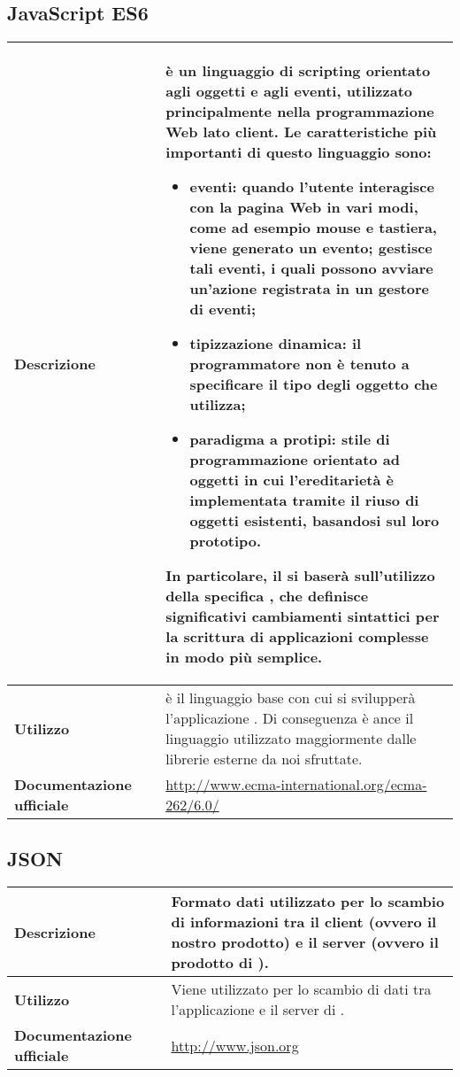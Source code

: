 \subsection{JavaScript ES6}
\label{JavaScript ES6}
\begin{table}[H]
	\centering
	\begin{tabular}{p{2cm}p{0.5cm}p{11.5cm}}
		\arrayrulecolor{lightgray}
		\toprule
		\textbf{Descrizione} & &
		\js{} è un linguaggio di scripting orientato agli oggetti e agli eventi, utilizzato principalmente nella programmazione Web lato client.
		Le caratteristiche più importanti di questo linguaggio sono:
		\begin{itemize}
			\item \textbf{eventi:} quando l'utente interagisce con la pagina Web in vari modi, come ad esempio mouse e tastiera, viene generato un evento; \js{} gestisce  tali eventi, i quali possono avviare un'azione registrata in un gestore di eventi;
			\item \textbf{tipizzazione dinamica:} il programmatore non è tenuto a specificare il tipo degli oggetto che utilizza;
			\item \textbf{paradigma a protipi:} stile di programmazione orientato ad oggetti in cui l'ereditarietà è implementata tramite il riuso di oggetti esistenti, basandosi sul loro prototipo.
		\end{itemize}
		In particolare, il \glo{Gruppo}{gruppo} si baserà sull'utilizzo della specifica \jsv{}, che definisce significativi cambiamenti sintattici per la scrittura di applicazioni complesse in modo più semplice.
		\\ \midrule
		\textbf{Utilizzo} & &
		\js{} è il linguaggio base con cui si svilupperà l'applicazione \progetto{}. Di conseguenza è ance il linguaggio utilizzato maggiormente dalle librerie esterne da noi sfruttate.
		\\ \midrule
		\textbf{Documentazione ufficiale} & &
		\url{http://www.ecma-international.org/ecma-262/6.0/}
		\\ \bottomrule
	\end{tabular}
\end{table}

\vspace{40px}
\subsection{JSON}
\label{JSON}
\begin{table}[H]
	\centering
	\begin{tabular}{p{2cm}p{0.5cm}p{11.5cm}}
		\arrayrulecolor{lightgray}
		\toprule
		\textbf{Descrizione} & &
		Formato dati utilizzato per lo scambio di informazioni tra il client (ovvero il nostro prodotto) e il server (ovvero il prodotto di \riskapp).
		\\ \midrule
		\textbf{Utilizzo} & &
		Viene utilizzato per lo scambio di dati tra l'applicazione \progetto e il server di \riskapp.
		\\ \midrule
		\textbf{Documentazione ufficiale} & &
		\url{http://www.json.org}
		\\ \bottomrule
	\end{tabular}
\end{table}

